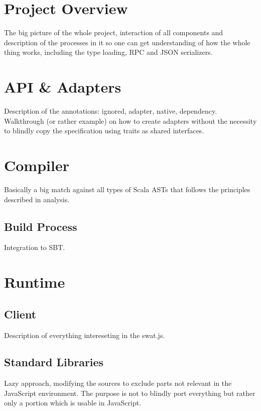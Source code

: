 \documentclass[12pt,a4paper]{report}
\begin{document}
\section{Project Overview}

The big picture of the whole project, interaction of all components and description of the processes in it so one can get understanding of how the whole thing works, including the type loading, RPC and JSON serializers.

\section{API \& Adapters}

Description of the annotations: ignored, adapter, native, dependency. Walkthrough (or rather example) on how to create adapters without the necessity to blindly copy the specification using traits as shared interfaces.

\section{Compiler}

Basically a big match against all types of Scala ASTs that follows the principles described in analysis.

\subsection{Build Process}

Integration to SBT.

\section{Runtime}

\subsection{Client}

Description of everything intereseting in the swat.js.

\subsection{Standard Libraries}

Lazy approach, modifying the sources to exclude parts not relevant in the JavaScript environment. The purpose is not to blindly port everything but rather only a portion which is usable in JavaScript.
\end{document}
